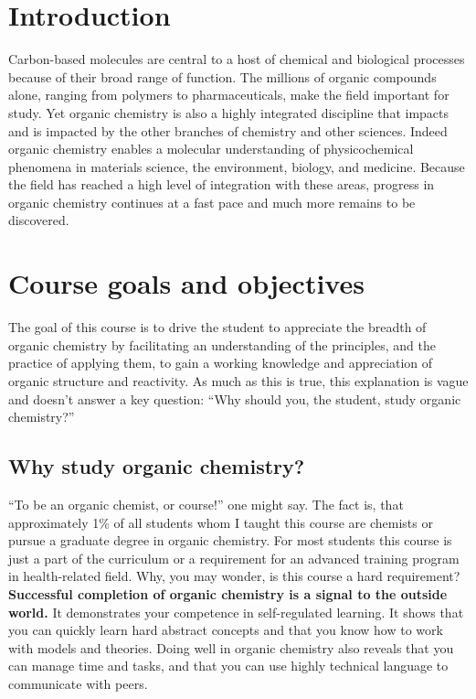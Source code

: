 \hypertarget{introduction}{%
\section{Introduction}\label{introduction}}

Carbon-based molecules are central to a host of chemical and biological
processes because of their broad range of function. The millions of
organic compounds alone, ranging from polymers to pharmaceuticals, make
the field important for study. Yet organic chemistry is also a highly
integrated discipline that impacts and is impacted by the other branches
of chemistry and other sciences. Indeed organic chemistry enables a
molecular understanding of physicochemical phenomena in materials
science, the environment, biology, and medicine. Because the field has
reached a high level of integration with these areas, progress in
organic chemistry continues at a fast pace and much more remains to be
discovered.

\hypertarget{course-goals-and-objectives}{%
\section{Course goals and
objectives}\label{course-goals-and-objectives}}

The goal of this course is to drive the student to appreciate the
breadth of organic chemistry by facilitating an understanding of the
principles, and the practice of applying them, to gain a working
knowledge and appreciation of organic structure and reactivity. As much
as this is true, this explanation is vague and doesn't answer a key
question: ``Why should you, the student, study organic chemistry?''

\hypertarget{why-study-organic-chemistry}{%
\subsection{Why study organic
chemistry?}\label{why-study-organic-chemistry}}

``To be an organic chemist, or course!'' one might say. The fact is,
that approximately 1\% of all students whom I taught this course are
chemists or pursue a graduate degree in organic chemistry. For most
students this course is just a part of the curriculum or a requirement
for an advanced training program in health-related field. Why, you may
wonder, is this course a hard requirement? \textbf{Successful completion
of organic chemistry is a signal to the outside world.} It demonstrates
your competence in self-regulated learning. It shows that you can
quickly learn hard abstract concepts and that you know how to work with
models and theories. Doing well in organic chemistry also reveals that
you can manage time and tasks, and that you can use highly technical
language to communicate with peers.

